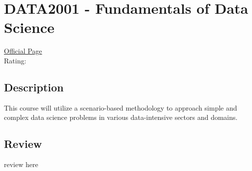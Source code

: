 \hypertarget{DATA2001}{\section{DATA2001 - Fundamentals of Data Science}}

\large
\textcolor{turbo_purple}{\href{https://my.uq.edu.au/programs-courses/course.html?course_code=DATA2001}{Official Page}} \\
Rating: \cstar\cstar\cstar\cstar\ostar

\normalsize
\subsection*{Description}
This course will utilize a scenario-based methodology to approach simple and complex data science problems in various data-intensive sectors and domains.

\subsection*{Review}
review here
